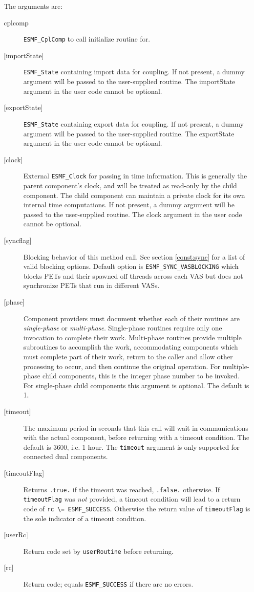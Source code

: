    The arguments are:
   \begin{description}
   \item[cplcomp]
     {\tt ESMF\_CplComp} to call initialize routine for.
   \item[{[importState]}]
     {\tt ESMF\_State} containing import data for coupling. If not present, a dummy
     argument will be passed to the user-supplied routine.  The
     importState argument in the user code cannot be optional.
   \item[{[exportState]}]
     {\tt ESMF\_State} containing export data for coupling. If not present, a dummy
     argument will be passed to the user-supplied routine.  The
     exportState argument in the user code cannot be optional.
   \item[{[clock]}]
     External {\tt ESMF\_Clock} for passing in time information.
     This is generally the parent component's clock, and will be treated
     as read-only by the child component.  The child component can maintain
     a private clock for its own internal time computations. If not present, a dummy
     argument will be passed to the user-supplied routine.  The
     clock argument in the user code cannot be optional.
   \item[{[syncflag]}]
     Blocking behavior of this method call. See section \ref{const:sync}
     for a list of valid blocking options. Default option is
     {\tt ESMF\_SYNC\_VASBLOCKING} which blocks PETs and their spawned off threads
     across each VAS but does not synchronize PETs that run in different VASs.
   \item[{[phase]}]
     Component providers must document whether each of their
     routines are {\em single-phase} or {\em multi-phase}.
     Single-phase routines require only one invocation to complete
     their work.
     Multi-phase routines provide multiple subroutines to accomplish
     the work, accommodating components which must complete part of their
     work, return to the caller and allow other processing to occur,
     and then continue the original operation.
     For multiple-phase child components, this is the integer phase
     number to be invoked.
     For single-phase child components this argument is optional. The default is
     1.
   \item[{[timeout]}]
     The maximum period in seconds that this call will wait in communications
     with the actual component, before returning with a timeout condition.
     The default is 3600, i.e. 1 hour. The {\tt timeout} argument is only
     supported for connected dual components.
   \item[{[timeoutFlag]}]
     Returns {\tt .true.} if the timeout was reached, {\tt .false.} otherwise.
     If {\tt timeoutFlag} was {\em not} provided, a timeout condition will lead
     to a return code of {\tt rc \textbackslash = ESMF\_SUCCESS}. Otherwise the
     return value of {\tt timeoutFlag} is the sole indicator of a timeout
     condition.
   \item[{[userRc]}]
     Return code set by {\tt userRoutine} before returning.
   \item[{[rc]}]
     Return code; equals {\tt ESMF\_SUCCESS} if there are no errors.
   \end{description}
   
